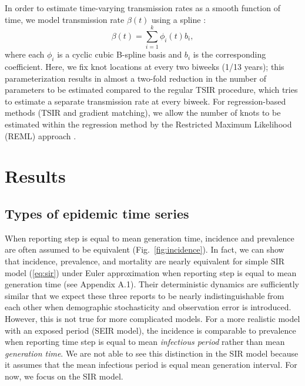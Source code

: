 \documentclass{article}
\newcommand{\eref}[1]{(\ref{eq:#1})}
\newcommand{\fref}[1]{Fig.~\ref{fig:#1}}
\begin{document}
In order to estimate time-varying transmission rates as a smooth function of time, we model transmission rate $\beta(t)$ using a spline \citep{hooker2010parameterizing}:
\begin{equation}
\beta(t) = \sum_{i=1}^k \phi_i(t) b_i,
\end{equation}
where each $\phi_i$ is a cyclic cubic B-spline basis and $b_i$ is the corresponding coefficient.
Here, we fix knot locations at every two biweeks (1/13 years);
this parameterization results in almost a two-fold reduction in the number of parameters to be estimated compared to the regular TSIR procedure, which tries to estimate a separate transmission rate at every biweek.
For regression-based methods (TSIR and gradient matching), we allow the number of knots to be estimated within the regression method by the Restricted Maximum Likelihood (REML) approach \citep{wood2012mgcv}.

\section{Results}

\subsection{Types of epidemic time series}

When reporting step is equal to mean generation time, incidence and prevalence are often assumed to be equivalent (\fref{incidence}).
In fact, we can show that incidence, prevalence, and mortality are nearly equivalent for simple SIR model \eref{sir} under Euler approximation when reporting step is equal to mean generation time (see Appendix A.1).
Their deterministic dynamics are sufficiently similar that we expect these three reports to be nearly indistinguishable from each other when demographic stochasticity and observation error is introduced.
However, this is not true for more complicated models.
For a more realistic model with an exposed period (SEIR model), the incidence is comparable to prevalence when reporting time step is equal to mean \emph{infectious period} rather than mean \emph{generation time}.
We are not able to see this distinction in the SIR model because it assumes that the mean infectious period is equal mean generation interval.
For now, we focus on the SIR model.
\end{document}
